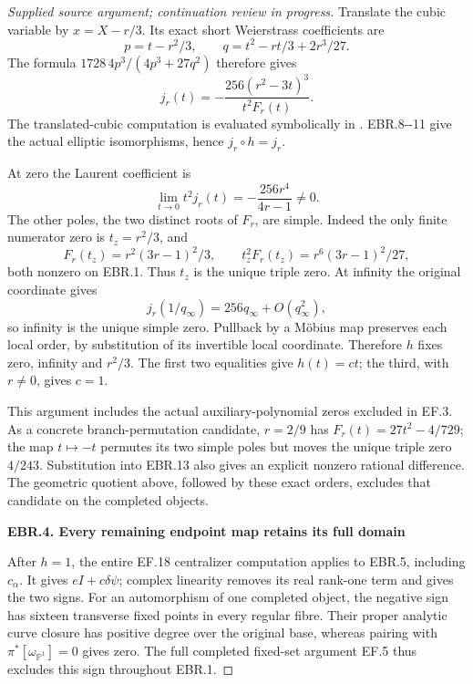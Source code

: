 \begin{proof}[Supplied source argument; continuation review in progress]
\par\nobreak

Translate the cubic variable by \(x=X-r/3\). Its exact short
Weierstrass coefficients are
\[
 p=t-r^2/3,\qquad q=t^2-rt/3+2r^3/27.
 \tag{EBR.12}
\]
The formula \(1728\,4p^3/(4p^3+27q^2)\) therefore gives
\[
 j_r(t)=
 -\frac{256(r^2-3t)^3}{t^2F_r(t)}.
 \tag{EBR.13}
\]
The translated-cubic computation is evaluated symbolically in . EBR.8-\/-11 give the actual
elliptic isomorphisms, hence \(j_r\circ h=j_r\).

At zero the Laurent coefficient is
\[
 \lim_{t\to0}t^2j_r(t)=-\frac{256r^4}{4r-1}\ne0.
 \tag{EBR.14}
\]
The other poles, the two distinct roots of \(F_r\), are simple.
Indeed the only finite numerator zero is \(t_z=r^2/3\), and
\[
 F_r(t_z)=r^2(3r-1)^2/3,\qquad
 t_z^2F_r(t_z)=r^6(3r-1)^2/27,
 \tag{EBR.15}
\]
both nonzero on EBR.1. Thus \(t_z\) is the unique triple zero.
At infinity the original coordinate gives
\[
 j_r(1/q_\infty)=256q_\infty+O(q_\infty^2),
 \tag{EBR.16}
\]
so infinity is the unique simple zero. Pullback by a Möbius map
preserves each local order, by substitution of its invertible
local coordinate. Therefore \(h\) fixes zero, infinity and
\(r^2/3\). The first two equalities give \(h(t)=ct\); the
third, with \(r\ne0\), gives \(c=1\).

This argument includes the actual auxiliary-polynomial zeros
excluded in EF.3. As a concrete branch-permutation candidate,
\(r=2/9\) has \(F_r(t)=27t^2-4/729\); the map \(t\mapsto-t\)
permutes its two simple poles but moves the unique triple zero
\(4/243\). Substitution into EBR.13 also gives an explicit
nonzero rational difference. The geometric quotient above,
followed by these exact orders, excludes that candidate on the
completed objects.

\par

\medskip\noindent\textbf{EBR.4. Every remaining endpoint map retains its full domain}

\par\nobreak

After \(h=1\), the entire EF.18 centralizer computation applies
to EBR.5, including \(c_\alpha\). It gives
\(eI+c\delta\psi\); complex linearity removes its real rank-one
term and gives the two signs. For an automorphism of one completed
object, the negative sign has sixteen transverse fixed points in
every regular fibre. Their proper analytic curve closure has
positive degree over the original base, whereas pairing with
\(\pi^*[\omega_{\mathbb P^1}]=0\) gives zero. The full completed
fixed-set argument EF.5 thus excludes this sign throughout EBR.1.


\end{proof}
